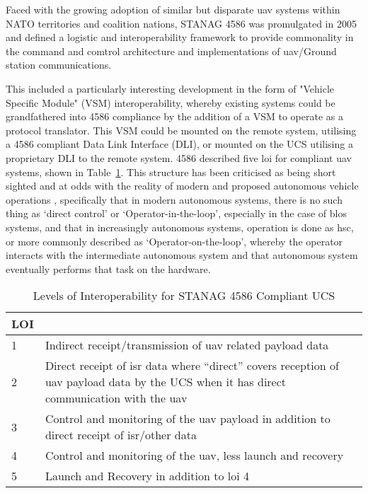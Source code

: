  Faced with the growing adoption of similar but disparate \acrshort{uav} systems within NATO territories and coalition nations, STANAG 4586\cite{STANAG4586} was promulgated in 2005 and defined a logistic and interoperability framework to provide commonality in the command and comtrol architecture and implementations of \acrshort{uav}/Ground station communications.
 
 This included a particularly interesting development in the form of "Vehicle Specific Module" (VSM) interoperability, whereby existing systems could be grandfathered into 4586 compliance by the addition of a VSM to operate as a protocol translator.
 This VSM could be mounted on the remote system, utilising a 4586 compliant Data Link Interface (DLI), or mounted on the UCS utilising a proprietary DLI to the remote system.
 4586 described five \acrshort{loi} for compliant \acrshort{uav} systems, shown in Table~\ref{tab:levels_of_interoperability}.
 This structure has been criticised as being short sighted and at odds with the reality of modern and proposed autonomous vehicle operations \cite{Cummings2010}, specifically that in modern autonomous systems, there is no such thing as ‘direct control’ or ‘Operator-in-the-loop’, especially in the case of \acrfull{blos} systems, and that in increasingly autonomous systems, operation is done as \acrfull{hsc}, or more commonly described as ‘Operator-on-the-loop’, whereby the operator interacts with the intermediate autonomous system and that autonomous system eventually performs that task on the hardware.
 
 \begin{table}
   \begin{tabularx}{\textwidth}{|l|X|}
     \hline  LOI &  \\ 
     \hline  1 &  Indirect receipt/transmission of \acrshort{uav} related payload data\\ 
     \hline  2 &  Direct receipt of \acrshort{isr} data where “direct” covers reception of \acrshort{uav} payload data by the UCS when it has direct communication with the \acrshort{uav}\\ 
     \hline  3 &  Control and monitoring of the \acrshort{uav} payload in addition to direct receipt of \acrshort{isr}/other data\\ 
     \hline  4 &  Control and monitoring of the \acrshort{uav}, less launch and recovery\\
     \hline  5 &  Launch and Recovery in addition to \acrshort{loi} 4\\ 
     \hline 
   \end{tabularx}
   \caption{Levels of Interoperability for STANAG 4586 Compliant UCS}
   \label{tab:levels_of_interoperability}
 \end{table}
 
